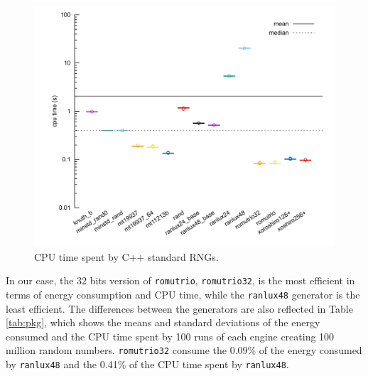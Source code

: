 \documentclass[dvipsnames,format=sigconf]{acmart}
\begin{document}
\begin{figure}
\centering
\includegraphics[width=\linewidth]{cpu.png}
\caption{CPU time spent by C++ standard RNGs.}
\label{fig:cpu}
\end{figure}


In our case, the 32 bits version of \texttt{romutrio}, \texttt{romutrio32}, is the most efficient in terms of energy consumption and CPU time, while the \texttt{ranlux48} generator is the least efficient. The differences between the generators are also reflected in Table \ref{tab:pkg}, which shows the means and standard deviations of the energy consumed and the CPU time spent by 100 runs of each engine creating 100 million random numbers. \texttt{romutrio32} consume the 0.09\% of the energy consumed by \texttt{ranlux48} and the 0.41\% of the CPU time spent by \texttt{ranlux48}.
\end{document}
